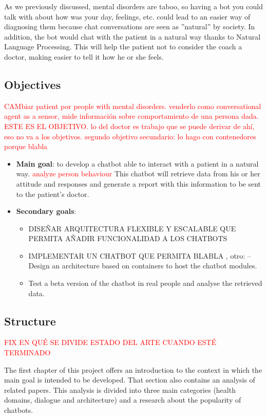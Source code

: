 \documentclass[12pt,english]{article}
\begin{document}
As we previously discussed, mental disorders are taboo, so having a bot you could talk with about how was your day, feelings, etc. could lead to an easier way of diagnosing them because chat conversations are seen as ''natural'' by society. In addition, the bot would chat with the patient in a natural way thanks to Natural Language Processing. This will help the patient not to consider the coach a doctor, making easier to tell it how he or she feels.

\newpage

\subsection{Objectives}

\textcolor{red}{CAMbiar  patient por people with mental disorders.}
\textcolor{red}{venderlo como conversational agent as a sensor, mide información sobre comportamiento de una persona dada. ESTE ES EL OBJETIVO. lo del doctor es trabajo que se puede derivar de ahí, eso no va a los objetivos.}
\textcolor{red}{segundo objetivo secundario: lo hago con contenedores porque blabla}
\begin{itemize}
  \item \textbf{Main goal}: to develop a chatbot able to interact with a patient in a natural way. \textcolor{red}{analyze person behaviour} This chatbot will retrieve data from his or her attitude and responses and generate a report with this information to be sent to the patient's doctor.
  \item \textbf{Secondary goals}:
    \begin{itemize}
      \item DISEÑAR ARQUITECTURA FLEXIBLE Y ESCALABLE QUE PERMITA AÑADIR FUNCIONALIDAD A LOS CHATBOTS
      \item IMPLEMENTAR UN CHATBOT QUE PERMITA BLABLA , otro: -- Design an architecture based on containers to host the chatbot modules.
      \item Test a beta version of the chatbot in real people and analyse the retrieved data.
    \end{itemize}
\end{itemize}

\subsection{Structure}
\textcolor{red}{FIX EN QUÉ SE DIVIDE ESTADO DEL ARTE CUANDO ESTÉ TERMINADO}

The first chapter of this project offers an introduction to the context in which the main goal is intended to be developed. That section also contains an analysis of related papers. This analysis is divided into three main categories (health domains, dialogue and architecture) and a research about the popularity of chatbots.\\
\end{document}

